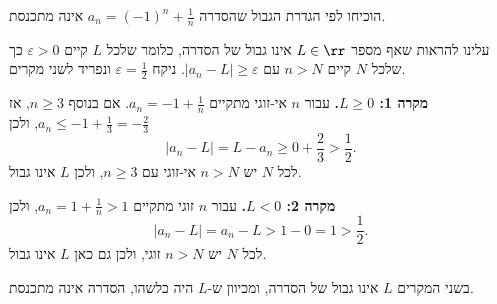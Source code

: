 הוכיחו לפי הגדרת הגבול שהסדרה
$a_n=(-1)^n+\frac1n$
אינה מתכנסת.
\begin{solbox}
עלינו להראות שאף מספר $L\in\rr$ אינו גבול של הסדרה, כלומר שלכל $L$ קיים
$\varepsilon>0$
כך שלכל $N$ קיים $n>N$ עם
$|a_n-L|\ge\varepsilon$.
ניקח
$\varepsilon=\frac12$
ונפריד לשני מקרים.

\textbf{מקרה 1: $L\ge0$.}
עבור $n$ אי-זוגי מתקיים
$a_n=-1+\frac1n$.
אם בנוסף $n\ge3$, אז $a_n\le-1+\frac13=-\frac23$, ולכן
$$|a_n-L|=L-a_n\ge0+\frac23>\frac12 .$$
לכל $N$ יש $n>N$ אי-זוגי עם $n\ge3$, ולכן $L$ אינו גבול.

\textbf{מקרה 2: $L<0$.}
עבור $n$ זוגי מתקיים
$a_n=1+\frac1n>1$, ולכן
$$|a_n-L|=a_n-L>1-0=1>\frac12 .$$
לכל $N$ יש $n>N$ זוגי, ולכן גם כאן $L$ אינו גבול.

בשני המקרים $L$ אינו גבול של הסדרה, ומכיוון ש-$L$ היה כלשהו, הסדרה אינה מתכנסת.
\end{solbox}

